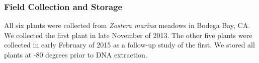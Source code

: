 
\subsubsection{\textbf{Field Collection and Storage}}

    All six plants were collected from \textit{Zostera marina} meadows in Bodega Bay, CA. We collected the first plant in late November of 2013. The other five plants were collected in early February of 2015 as a follow-up study of the first. We stored all plants at -80 degrees prior to DNA extraction. 
    